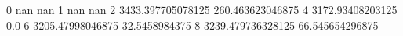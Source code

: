 0 nan nan
1 nan nan
2 3433.397705078125 260.463623046875
4 3172.93408203125 0.0
6 3205.47998046875 32.5458984375
8 3239.479736328125 66.545654296875
